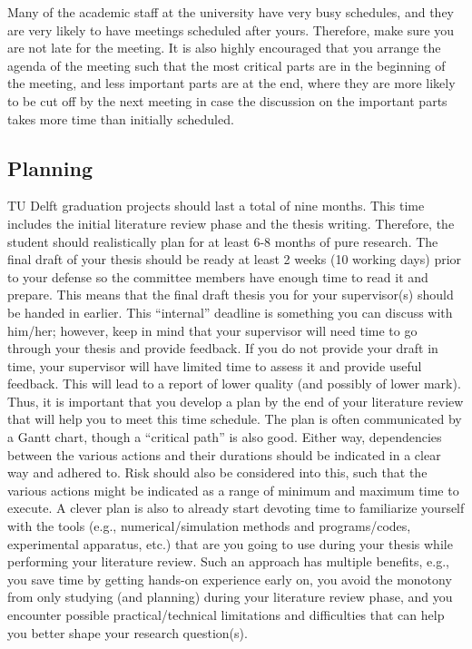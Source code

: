 \documentclass{article}
\begin{document}
Many of the academic staff at the university have very busy schedules, and they are very likely to have meetings scheduled after yours. Therefore, make sure you are not late for the meeting.  It is also highly encouraged that you arrange the agenda of the meeting such that the most critical parts are in the beginning of the meeting, and less important parts are at the end, where they are more likely to be cut off by the next meeting in case the discussion on the important parts takes more time than initially scheduled. 

\subsection{Planning}
TU Delft graduation projects should last a total of nine months. This time includes the initial literature review phase and the thesis writing. Therefore, the student should realistically plan for at least 6-8 months of pure research. The final draft of your thesis should be ready at least 2 weeks (10 working days) prior to your defense so the committee members have enough time to read it and prepare. This means that the final draft thesis you for your supervisor(s) should be handed in earlier. This “internal” deadline is something you can discuss with him/her; however, keep in mind that your supervisor will need time to go through your thesis and provide feedback. If you do not provide your draft in time, your supervisor will have limited time to assess it and provide useful feedback. This will lead to a report of lower quality (and possibly of lower mark). Thus, it is important that you develop a plan by the end of your literature review that will help you to meet this time schedule. The plan is often communicated by a Gantt chart, though a “critical path” is also good. Either way, dependencies between the various actions and their durations should be indicated in a clear way and adhered to. Risk should also be considered into this, such that the various actions might be indicated as a range of minimum and maximum time to execute. A clever plan is also to already start devoting time to familiarize yourself with the tools (e.g., numerical/simulation methods and programs/codes, experimental apparatus, etc.) that are you going to use during your thesis while performing your literature review. Such an approach has multiple benefits, e.g., you save time by getting hands-on experience early on, you avoid the monotony from only studying (and planning) during your literature review phase, and you encounter possible practical/technical limitations and difficulties that can help you better shape your research question(s). 
\end{document}
